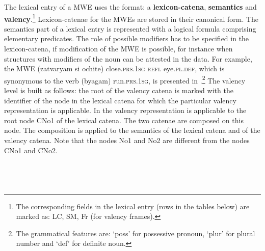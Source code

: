 \documentclass[output=paper]{langsci/langscibook}
\begin{document}
The lexical entry of a MWE uses the format: a \textbf{ lexicon-catena}, \textbf{semantics} and \textbf{ valency}.\footnote{The corresponding fields in the lexical entry (rows in the tables below) are marked as: LC, SM, Fr (for valency frames).} Lexicon-catenae for the MWEs are stored in their canonical form. The semantics part of a lexical entry is represented with a logical formula comprising elementary predicates. The role of possible modifiers has to be specified in the lexicon-catena, if modification of the MWE is possible, for instance when structures with modifiers of the noun can be attested in the data. For example, the MWE \textit{} (zatvaryam si ochite) close.\textsc{prs.1sg} \textsc{refl} eye\textsc{.pl.def}, which is synonymous to the verb \textit{} (byagam) run.\textsc{prs.1sg}, is presented in .\footnote{The grammatical features are: `poss' for possessive pronoun, `plur' for plural number and `def' for definite noun.} The valency level is built as follows: the root of the valency catena is marked with the identifier of the node in the lexical catena for which the particular valency representation is applicable. In  the valency representation is applicable to the root node CNo1 of the lexical catena. The two catenae are composed on this node. The composition is applied to the semantics of the lexical catena and of the valency catena.  Note that the nodes No1 and No2 are different from the nodes CNo1 and CNo2.




\twocolumn

\verb+   +

\verb+   +
\end{document}
